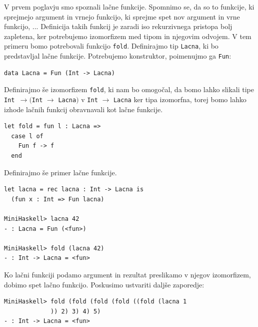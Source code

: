 \documentclass[a4paper,12pt,openright]{book}
\begin{document}
V prvem poglavju smo spoznali lačne funkcije. Spomnimo se, da so to funkcije, ki sprejmejo argument in vrnejo funkcijo, ki sprejme spet nov argument in vrne funkcijo, ... Definicija 
takih funkcij je zaradi iso rekurzivnega pristopa bolj zapletena, ker potrebujemo izomorfizem med tipom in njegovim odvojem. V tem primeru bomo potrebovali funkcijo \lstinline{fold}. 
Definirajmo tip \lstinline{Lacna}, ki bo predstavljal lačne funkcije. Potrebujemo konstruktor, poimenujmo ga \lstinline{Fun}:
\begin{lstlisting}
data Lacna = Fun (Int -> Lacna)
\end{lstlisting}
Definirajmo še izomorfizem \lstinline{fold}, ki nam bo omogočal, da bomo lahko slikali tipe \lstinline{Int }$\rightarrow ($\lstinline{Int} $\rightarrow$ \lstinline{Lacna}$)$ v \lstinline{Int} $\rightarrow$ \lstinline{Lacna} 
ker tipa izomorfna, torej bomo lahko izhode lačnih funkcij obravnavali kot lačne funkcije.
\begin{lstlisting}
let fold = fun l : Lacna =>
  case l of
    Fun f -> f
  end
\end{lstlisting}
Definirajmo še primer lačne funkcije.
\begin{lstlisting}
let lacna = rec lacna : Int -> Lacna is
  (fun x : Int => Fun lacna)

MiniHaskell> lacna 42
- : Lacna = Fun (<fun>)

MiniHaskell> fold (lacna 42)
- : Int -> Lacna = <fun>
\end{lstlisting}
Ko lačni funkciji podamo argument in rezultat preslikamo v njegov izomorfizem, dobimo spet lačno funkcijo. Poskusimo ustvariti daljše zaporedje:
\begin{lstlisting}
MiniHaskell> fold (fold (fold (fold ((fold (lacna 1
             )) 2) 3) 4) 5)
- : Int -> Lacna = <fun>
\end{lstlisting}
\end{document}
